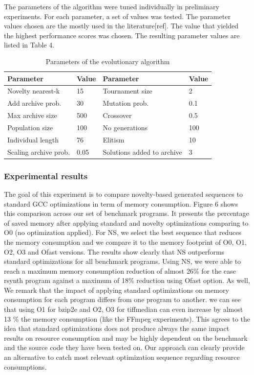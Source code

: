 The parameters of the algorithm were tuned individually in preliminary experiments. For each parameter, a set of values was tested. The parameter values chosen are the mostly used in the literature[ref]. The value that yielded the highest performance scores was chosen. The resulting parameter values are listed in Table 4.
\begin{table}
		\caption{Parameters of the evolutionary algorithm}
		\begin{tabular}{ l l || l l }
			Parameter & Value & Parameter & Value \\	\hline
			Novelty nearest-k  & 15 &  Tournament size & 2\\ 
			Add archive prob. & 30 &  Mutation prob. & 0.1\\  
			Max archive size & 500 &  Crossover & 0.5  \\  
			Population size & 100 &  No generations &  100 \\  
			Individual length & 76 & Elitism & 10  \\ 
			Scaling archive prob. & 0.05 & Solutions added to archive & 3  \\ 
		\end{tabular}
\end{table}

\subsubsection{Experimental results}
The goal of this experiment is to compare novelty-based generated sequences to standard GCC optimizations in term of memory consumption. Figure 6 shows this comparison across our set of benchmark programs. It presents the percentage of saved memory after applying standard and novelty optimizations comparing to O0 (no optimization applied).
For NS, we select the best sequence that reduces the memory consumption and we compare it to the memory footprint of O0, O1, O2, O3 and Ofast versions. The results show clearly that NS outperforms standard optimizations for all benchmark programs. Using NS, we were able to reach a maximum memory consumption reduction of almost 26\% for the case rsynth program against a maximum of 18\% reduction using Ofast option. As well, We remark that the impact of applying standard optimizations on memory consumption for each program differs from one program to another. we can see that using O1 for bzip2e and O2, O3 for tiffmedian can even increase by almost 13 \% the memory consumption (like the FFmpeg experiments). This agrees to the idea that standard optimizations does not produce always the same impact results on resource consumption and may be highly dependent on the benchmark and the source code they have been tested on. Our approach can clearly provide an alternative to catch most relevant optimization sequence regarding resource consumptions.


